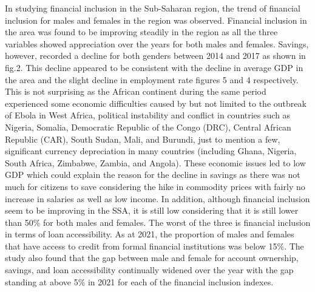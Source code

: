 \documentclass[preprint, 3p,
authoryear]{elsarticle} %
\begin{document}
In studying financial inclusion in the Sub-Saharan region, the trend of
financial inclusion for males and females in the region was observed.
Financial inclusion in the area was found to be improving steadily in
the region as all the three variables showed appreciation over the years
for both males and females. Savings, however, recorded a decline for
both genders between 2014 and 2017 as shown in fig.2. This decline
appeared to be consistent with the decline in average GDP in the area
and the slight decline in employment rate figures 5 and 4 respectively.
This is not surprising as the African continent during the same period
experienced some economic difficulties caused by but not limited to the
outbreak of Ebola in West Africa, political instability and conflict in
countries such as Nigeria, Somalia, Democratic Republic of the Congo
(DRC), Central African Republic (CAR), South Sudan, Mali, and Burundi,
just to mention a few, significant currency depreciation in many
countries (including Ghana, Nigeria, South Africa, Zimbabwe, Zambia, and
Angola). These economic issues led to low GDP which could explain the
reason for the decline in savings as there was not much for citizens to
save considering the hike in commodity prices with fairly no increase in
salaries as well as low income. In addition, although financial
inclusion seem to be improving in the SSA, it is still low considering
that it is still lower than 50\% for both males and females. The worst
of the three is financial inclusion in terms of loan accessibility. As
at 2021, the proportion of males and females that have access to credit
from formal financial institutions was below 15\%. The study also found
that the gap between male and female for account ownership, savings, and
loan accessibility continually widened over the year with the gap
standing at above 5\% in 2021 for each of the financial inclusion
indexes.

\bigskip
\end{document}
